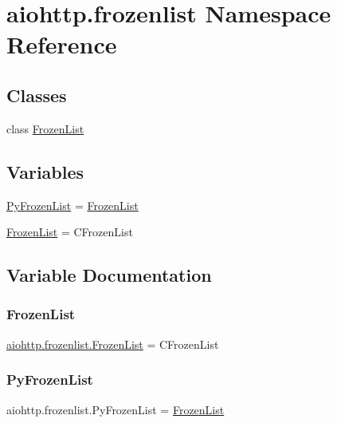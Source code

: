 \hypertarget{namespaceaiohttp_1_1frozenlist}{}\section{aiohttp.\+frozenlist Namespace Reference}
\label{namespaceaiohttp_1_1frozenlist}
\subsection*{Classes}
\begin{DoxyCompactItemize}
\item 
class \hyperlink{classaiohttp_1_1frozenlist_1_1_frozen_list}{Frozen\+List}
\end{DoxyCompactItemize}
\subsection*{Variables}
\begin{DoxyCompactItemize}
\item 
\hyperlink{namespaceaiohttp_1_1frozenlist_a2da5b131a1fdc0f84418a4001e789e40}{Py\+Frozen\+List} = \hyperlink{classaiohttp_1_1frozenlist_1_1_frozen_list}{Frozen\+List}
\item 
\hyperlink{namespaceaiohttp_1_1frozenlist_aae61facc66f858146fc18d05ebcee238}{Frozen\+List} = C\+Frozen\+List
\end{DoxyCompactItemize}


\subsection{Variable Documentation}
\mbox{\label{namespaceaiohttp_1_1frozenlist_aae61facc66f858146fc18d05ebcee238}} 
\subsubsection{\texorpdfstring{Frozen\+List}{FrozenList}}
{\footnotesize\ttfamily \hyperlink{classaiohttp_1_1frozenlist_1_1_frozen_list}{aiohttp.\+frozenlist.\+Frozen\+List} = C\+Frozen\+List}

\mbox{\label{namespaceaiohttp_1_1frozenlist_a2da5b131a1fdc0f84418a4001e789e40}} 
\subsubsection{\texorpdfstring{Py\+Frozen\+List}{PyFrozenList}}
{\footnotesize\ttfamily aiohttp.\+frozenlist.\+Py\+Frozen\+List = \hyperlink{classaiohttp_1_1frozenlist_1_1_frozen_list}{Frozen\+List}}

